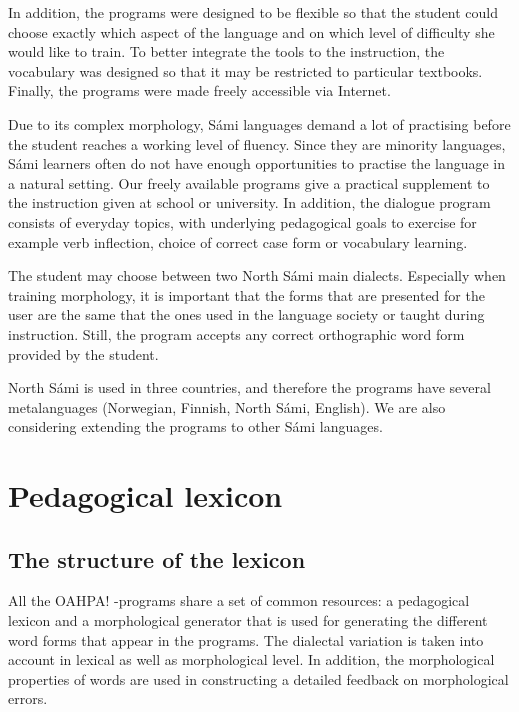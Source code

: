 \documentclass[11pt]{article}
\begin{document}
In addition, the programs were designed to be flexible so that the student could choose exactly which aspect of the language and on which level of difficulty she would like to train. To better integrate the tools to the instruction, the vocabulary was designed so that it may be restricted to particular textbooks. Finally, the programs were made freely accessible via Internet.

Due to its complex morphology, Sámi languages demand a lot of practising before the student reaches 
a working level of fluency. %
Since they are minority languages, Sámi learners often do not have enough opportunities to practise the language in a natural setting. Our freely available programs give a practical supplement to the instruction given at school or university. In addition, the dialogue program consists of everyday topics, with underlying pedagogical goals to exercise for example verb inflection, choice of correct case form or vocabulary learning. 

The student may choose between two North Sámi main dialects. Especially when training morphology, it is important that the forms that are presented for the user are the same that the ones used in the language society or taught during instruction. Still, the program accepts any correct orthographic word form provided by the student.

North Sámi is used in three countries, and therefore the programs have several metalanguages (Norwegian, Finnish, North Sámi, English). We are also considering extending the programs to other Sámi languages.

\section{Pedagogical lexicon}\label{pedlex}

\subsection{The structure of the lexicon}


All the OAHPA! -programs share a set of common resources: a pedagogical lexicon and a morphological generator that is used for generating the different word forms that appear in the programs. The dialectal variation is taken into account in lexical as well as morphological level. In addition, the morphological properties of words are used in constructing a detailed feedback on morphological errors.
\end{document}
